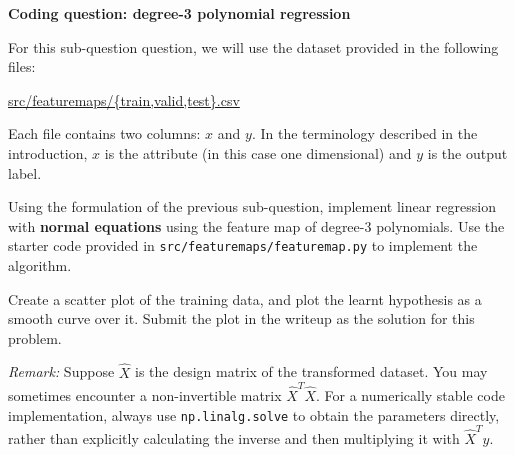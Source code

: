 \item {} {\bf Coding question: degree-3 polynomial regression}


For this sub-question question, we will use the dataset provided in
the following files:
%
\begin{center}
	\url{src/featuremaps/{train,valid,test}.csv}
\end{center}
%

Each file contains two columns: $x$ and $y$. In the terminology described in the introduction, $x$ is the attribute (in this case one dimensional) and $y$ is the output label.

Using the formulation of the previous sub-question, implement linear regression with \textbf{normal equations} using the feature map of degree-3 polynomials. Use the starter code provided in \texttt{src/featuremaps/featuremap.py} to implement the algorithm.

Create a scatter plot of the training data, and plot the learnt hypothesis as a smooth curve over it. Submit the plot in the writeup as the solution for this problem.

\emph{Remark: } Suppose $\widehat{X}$ is the design matrix of the transformed dataset. You may sometimes encounter a non-invertible matrix $\widehat{X}^T\widehat{X}$. For a numerically stable code implementation, always use \texttt{np.linalg.solve} to obtain the parameters directly, rather than explicitly calculating the inverse and then multiplying it with $\widehat{X}^Ty$.


